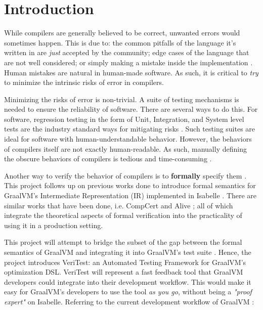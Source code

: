 \setcounter{page}{1}
\section{Introduction}

While compilers are generally believed to be correct, unwanted errors would sometimes happen. This is due to: the common pitfalls of the 
language it's written in are \emph{just} accepted by the community; edge cases of the language that are not well considered; or simply making a 
mistake inside the implementation \cite[Sec. 1.2]{CompilerOptimization}. Human mistakes are natural in human-made software. As such, it is 
critical to \emph{try} to minimize the intrinsic risks of error in compilers.

Minimizing the risks of error is non-trivial. A suite of testing mechanisms is needed to ensure the reliability of software. 
There are several ways to do this. For software, regression testing in the form of Unit, Integration, and System level tests are the 
industry standard ways for mitigating risks \cite{testing}. Such testing suites are ideal for software with human-understandable behavior. However, 
the behaviors of compilers itself are not exactly human-readable. As such, manually defining the obscure behaviors of compilers is tedious and 
time-consuming \cite{compcertVerification}.

Another way to verify the behavior of compilers is to \textbf{formally} specify them \cite{compcertVerification}. This project follows up on 
previous works done to introduce formal semantics for GraalVM's \cite{graal} Intermediate Representation (IR)
\cite{ATVA21_GraalVM_IR_Semantics, Term_Graph_Optimizations} implemented in Isabelle \cite{IsabelleHOL}. There are similar works that have been 
done, i.e. CompCert \cite{compcertVerification} and Alive \cite{AliveInLean,Alive2}; all of which integrate the theoretical aspects of formal 
verification into the practicality of using it in a production setting.

This project will attempt to bridge the subset of the gap between the formal semantics of GraalVM and integrating it into GraalVM's test suite 
\cite{Term_Graph_Optimizations}. Hence, the project introduces VeriTest: an Automated Testing Framework for GraalVM's optimization DSL. 
VeriTest will represent a fast feedback tool that GraalVM developers could integrate into their development workflow. This would make it easy for 
GraalVM's developers to use the tool \emph{as you go}, without being a \emph{"proof expert"} on Isabelle.
Referring to the current development workflow of GraalVM \cite[Sec. 5.1]{Term_Graph_Optimizations}: 

